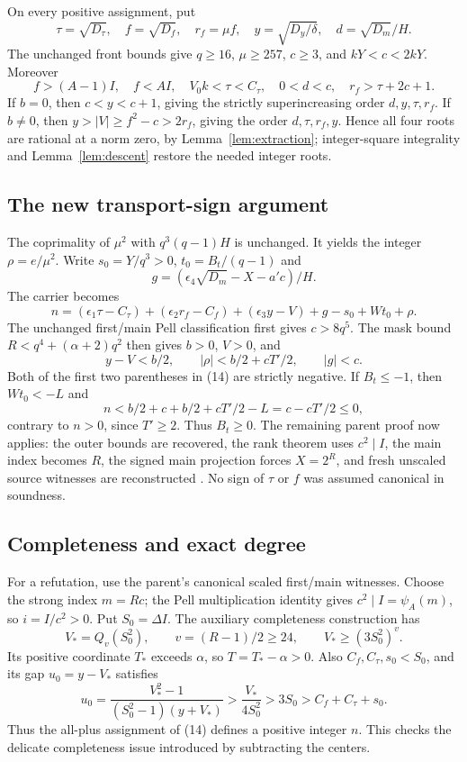 \documentclass[11pt,letterpaper]{article}
\theoremstyle{definition}\newtheorem{definition}[theorem]{Definition}
\theoremstyle{remark}\newtheorem{remark}[theorem]{Remark}
\begin{document}
On every positive assignment, put
\[
 \tau=\sqrt{D_\tau},\quad f=\sqrt{D_f},\quad r_f=\mu f,
 \quad y=\sqrt{D_y/\delta},\quad d=\sqrt{D_m}/H.
\]
The unchanged front bounds give $q\ge16$, $\mu\ge257$, $c\ge3$, and $kY<c<2kY$. Moreover
\[
 f>(A-1)I,\quad f<AI,\quad
 V_0k<\tau<C_\tau,\quad 0<d<c,
 \quad r_f>\tau+2c+1.
\]
If $b=0$, then $c<y<c+1$, giving the strictly superincreasing order $d,y,\tau,r_f$. If $b\ne0$, then $y>|V|\ge f^2-c>2r_f$, giving the order $d,\tau,r_f,y$. Hence all four roots are rational at a norm zero, by Lemma~\ref{lem:extraction}; integer-square integrality and Lemma~\ref{lem:descent} restore the needed integer roots.

\subsection{The new transport-sign argument}
The coprimality of $\mu^2$ with $q^3(q-1)H$ is unchanged. It yields the integer $\rho=e/\mu^2$. Write $s_0=Y/q^3>0$, $t_0=B_t/(q-1)$ and
\[
 g=(\epsilon_4\sqrt{D_m}-X-a'c)/H.
\]
The carrier becomes
\[
 n=(\epsilon_1\tau-C_\tau)+(\epsilon_2r_f-C_f)
 +(\epsilon_3y-V)+g-s_0+Wt_0+\rho.
 \tag{14}\label{eq:transport10}
\]
The unchanged first/main Pell classification first gives $c>8q^5$. The mask bound $R<q^4+(\alpha+2)q^2$ then gives $b>0$, $V>0$, and
\[
 y-V<b/2,\qquad |\rho|<b/2+cT'/2,\qquad |g|<c.
\]
Both of the first two parentheses in (14) are strictly negative. If $B_t\le-1$, then $Wt_0<-L$ and
\[
 n<b/2+c+b/2+cT'/2-L=c-cT'/2\le0,
\]
contrary to $n>0$, since $T'\ge2$. Thus $B_t\ge0$. The remaining parent proof now applies: the outer bounds are recovered, the rank theorem uses $c^2\mid I$, the main index becomes $R$, the signed main projection forces $X=2^R$, and fresh unscaled source witnesses are reconstructed \cite{parent10,source61}. No sign of $\tau$ or $f$ was assumed canonical in soundness.

\subsection{Completeness and exact degree}
For a refutation, use the parent's canonical scaled first/main witnesses. Choose the strong index $m=Rc$; the Pell multiplication identity gives $c^2\mid I=\psi_A(m)$, so $i=I/c^2>0$. Put $S_0=\Delta I$. The auxiliary completeness construction has
\[
 V_*=Q_v(S_0^2),\qquad v=(R-1)/2\ge24,\qquad
 V_*\ge(3S_0^2)^v.
\]
Its positive coordinate $T_*$ exceeds $\alpha$, so $T=T_*-\alpha>0$. Also $C_f,C_\tau,s_0<S_0$, and its gap $u_0=y-V_*$ satisfies
\[
 u_0=\frac{V_*^2-1}{(S_0^2-1)(y+V_*)}
 >\frac{V_*}{4S_0^2}>3S_0>C_f+C_\tau+s_0.
\]
Thus the all-plus assignment of (14) defines a positive integer $n$. This checks the delicate completeness issue introduced by subtracting the centers.
\end{document}
